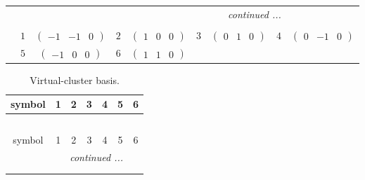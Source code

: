 \documentclass[fleqn,10pt,landscape]{article}
\begin{document}
\begin{itemize}
{\begin{center}
\begin{longtable}{ccccccccc}
 \hline \hline
\multicolumn{8}{r}{\footnotesize\it continued ...} \\ \endfoot

 \hline \hline
\multicolumn{8}{r}{} \\ \endlastfoot

 & $ 1 $ & $ \begin{pmatrix} -1 & -1 & 0 \end{pmatrix} $ & $ 2 $ & $ \begin{pmatrix} 1 & 0 & 0 \end{pmatrix} $ & $ 3 $ & $ \begin{pmatrix} 0 & 1 & 0 \end{pmatrix} $ & $ 4 $ & $ \begin{pmatrix} 0 & -1 & 0 \end{pmatrix} $ \\
& $ 5 $ & $ \begin{pmatrix} -1 & 0 & 0 \end{pmatrix} $ & $ 6 $ & $ \begin{pmatrix} 1 & 1 & 0 \end{pmatrix} $ & $  $ & $  $ & $  $ & $  $ \\
\end{longtable}
\end{center}
\begin{center}
\renewcommand{\arraystretch}{1.7}
\begin{longtable}{ccccccc}
\caption{Virtual-cluster basis.}
 \\
 \hline \hline
symbol & 1 & 2 & 3 & 4 & 5 & 6 \\ \hline \endfirsthead

\multicolumn{6}{l}{\tablename\ \thetable{}} \\
 \hline \hline
symbol & 1 & 2 & 3 & 4 & 5 & 6 \\ \hline \endhead

 \hline \hline
\multicolumn{6}{r}{\footnotesize\it continued ...} \\ \endfoot

 \hline \hline
\multicolumn{6}{r}{} \\ \endlastfoot


\end{longtable}
\end{center}}
\end{itemize}
\end{document}
